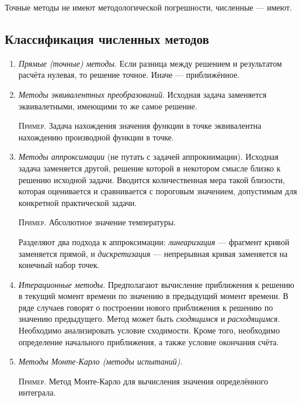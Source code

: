\documentclass{article}
\begin{document}
Точные методы не имеют методологической погрешности, численные --- имеют.

\subsection{Классификация численных методов}

\begin{enumerate}
  \item \textit{Прямые (точные) методы}. Если разница между решением и
    результатом расчёта нулевая, то решение точное. Иначе --- приближённое.

  \item \textit{Методы эквивалентных преобразований}. Исходная задача заменяется
    эквивалетными, имеющими то же самое решение.

    \textsc{Пример}. Задача нахождения значения функции в точке эквивалентна
    нахождению производной функции в точке.
    
  \item \textit{Методы аппроксимации} (не путать с задачей аппрокиимации).
    Исходная задача заменяется другой, решение которой в некотором смысле близко
    к решению исходной задачи. Вводится количественная мера такой близости,
    которая оценивается и сравнивается с пороговым значением, допустимым для
    конкретной практической задачи.

    \textsc{Пример}. Абсолютное значение температуры.

    Разделяют два подхода к аппроксимации: \textit{линеаризация} --- фрагмент
    кривой заменяется прямой, и \textit{дискретизация} --- непрерывная кривая
    заменяется на конечный набор точек.

  \item \textit{Итерационные методы}. Предполагают вычисление приближения к
    решению в текущий момент времени по значению в предыдущий момент времени. В
    ряде случаев говорят о построении нового приближения к решению по значению
    предыдущего. Метод может быть \textit{сходящимся} и \textit{расходящимся}.
    Необходимо анализировать условие сходимости. Кроме того, необходимо
    определение начального приближения, а также условие окончания счёта.

  \item \textit{Методы Монте-Карло (методы испытаний)}.

    \textsc{Пример}. Метод Монте-Карло для вычисления значения определённого
    интеграла.

\end{enumerate}
\end{document}
